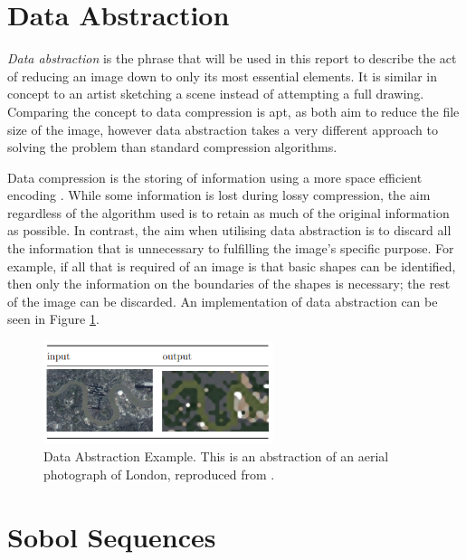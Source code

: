 \section{Data Abstraction}
\label{Subsection:abstract}

\textit{Data abstraction} is the phrase that will be used in this report to describe the act of reducing an image down to only its most essential elements. It is similar in concept to an artist sketching a scene instead of attempting a full drawing. Comparing the concept to data compression is apt, as both aim to reduce the file size of the image, however data abstraction takes a very different approach to solving the problem than standard compression algorithms.

Data compression is the storing of information using a more space efficient encoding \cite{compression}. While some information is lost during lossy compression, the aim regardless of the algorithm used is to retain as much of the original information as possible. In contrast, the aim when utilising data abstraction is to discard all the information that is unnecessary to fulfilling the image's specific purpose. For example, if all that is required of an image is that basic shapes can be identified, then only the information on the boundaries of the shapes is necessary; the rest of the image can be discarded. An implementation of data abstraction can be seen in Figure \ref{fig:abstraction3rdyear}.


\begin{figure}[H]
    \begin{center}
      \includegraphics[width=0.6\textwidth]{Figures/abstraction3rdyear.png}
      \caption[Data Abstraction Example]{Data Abstraction Example. This is an abstraction of an aerial photograph of London, reproduced from \cite{abstraction3rdyear}.}
      \label{fig:abstraction3rdyear}
    \end{center}
\end{figure}

\section{Sobol Sequences}
\label{Subsection:sobol}

